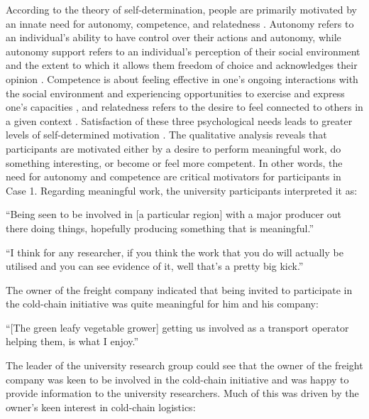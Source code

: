 According to the theory of self-determination, people are primarily motivated by an innate need for autonomy, competence, and relatedness \citep{deci1989self}. Autonomy refers to an individual's ability to have control over their actions and autonomy, while autonomy support refers to an individual's perception of their social environment and the extent to which it allows them freedom of choice and acknowledges their opinion \citep{sweet2012testing}. Competence is about feeling effective in one's ongoing interactions with the social environment and experiencing opportunities to exercise and express one's capacities \citep{vansteenkiste2020basic}, and relatedness refers to the desire to feel connected to others in a given context \citep{deci2001need}. Satisfaction of these three psychological needs leads to greater levels of self-determined motivation \citep{sweet2012testing}. The qualitative analysis reveals that participants are motivated either by a desire to perform meaningful work, do something interesting, or become or feel more competent. In other words, the need for autonomy and competence are critical motivators for participants in Case 1. Regarding meaningful work, the university participants interpreted it as:

\begin{displayquote}[Participant 15/1]
\small
\enquote{Being seen to be involved in [a particular region] with a major producer out there doing things, hopefully producing something that is meaningful.} 
\end{displayquote}


\begin{displayquote}[Participant 16/1]
\small
\enquote{I think for any researcher, if you think the work that you do will actually be utilised and you can see evidence of it, well that’s a pretty big kick.}
\end{displayquote}

The owner of the freight company indicated that being invited to participate in the cold-chain initiative was quite meaningful for him and his company:

\begin{displayquote}[Participant 8/1]
\small
\enquote{[The green leafy vegetable grower] getting us involved as a transport operator helping them, is what I enjoy.} 
\end{displayquote}

The leader of the university research group could see that the owner of the freight company was keen to be involved in the cold-chain initiative and was happy to provide information to the university researchers. Much of this was driven by the owner's keen interest in cold-chain logistics:

